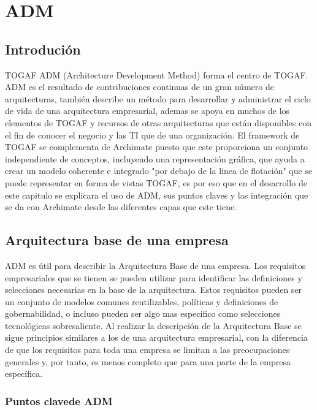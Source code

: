 \chapter{ADM}


\section{Introdución}

TOGAF ADM (Architecture Development Method) forma el centro de TOGAF. ADM es el resultado de contribuciones continuas de un gran número de arquitecturas, también describe un método para desarrollar y administrar el ciclo de vida de una arquitectura empresarial, ademas se apoya en muchos de los elementos de TOGAF y recursos de otras arquitecturas que están disponibles con el fin de conocer el negocio y las TI que de una organización.
\newline
El framework de TOGAF se complementa de Archimate puesto que este proporciona un conjunto independiente de conceptos, incluyendo una representación gráfica, que ayuda a crear un modelo coherente e integrado  "por debajo de la linea de flotación" que se puede representar en forma de vistas TOGAF, es por eso que en el desarrollo de este capitulo se explicara el uso de ADM, sus puntos claves y las integración que se da con Archimate desde las diferentes capas que este tiene.

\newpage

\section{Arquitectura base de una empresa}

ADM es útil para describir la Arquitectura Base de una empresa. Los requisitos empresariales que se tienen se pueden utilizar para identificar las definiciones y selecciones necesarias en la base de la arquitectura. Estos requisitos pueden ser un conjunto de modelos comunes reutilizables, políticas y definiciones de gobernabilidad, o incluso pueden ser algo mas especifico como selecciones tecnológicas sobresaliente. Al realizar la descripción de la Arquitectura Base se sigue principios similares a los de una arquitectura empresarial, con la diferencia de que los requisitos para toda una empresa se limitan a las preocupaciones generales y, por tanto, es menos completo que para una parte de la empresa específica.

\subsection{Puntos clavede ADM}

